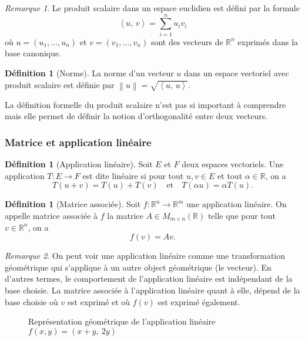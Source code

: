 \documentclass[11pt,a4paper]{article}
\numberwithin{equation}{section}
\theoremstyle{plain}
\theoremstyle{definition}
\newtheorem{definition}[theorem]{Définition}
\theoremstyle{remark}
\newtheorem*{remark}{Remarque}
\newcommand{\R}{\mathbb{R}}
\newcommand{\norm}[1]{\left\lVert #1\right\rVert}
\newcommand{\ip}[2]{\left\langle #1,\, #2\right\rangle}
\begin{document}
\begin{remark} \label{rem:ip}
    Le produit scalaire dans un espace euclidien est défini par la formule
    \[
        \ip{u}{v} = \sum_{i=1}^n u_i v_i
    \]
    où \(u = (u_1, \ldots, u_n)\) et \(v = (v_1, \ldots, v_n)\) sont des vecteurs de \(\R^n\) exprimés dans la base canonique.
\end{remark}

\begin{definition}[Norme]
    La norme d'un vecteur \(u\) dans un espace vectoriel avec produit scalaire est définie par \(\norm{u} = \sqrt{\ip{u}{u}}\).
\end{definition}

La définition formelle du produit scalaire n'est pas si important à comprendre mais elle permet de définir la notion d'orthogonalité entre deux vecteurs.

\subsubsection{Matrice et application linéaire}

\begin{definition}[Application linéaire]
Soit $E$ et $F$ deux espaces vectoriels. Une application $T : E \to F$ est dite linéaire si pour tout $u,v \in E$ et tout \(\alpha \in \R\), on a
\[
    T(u+v) = T(u) + T(v) \quad \text{et} \quad T(\alpha u) = \alpha T(u).
\]
\end{definition}

\begin{definition}[Matrice associée]
Soit $f : \R^n \to \R^m$ une application linéaire. On appelle matrice associée à $f$ la matrice $A \in M_{m \times n}(\R)$ telle que pour tout $v \in \R^n$, on a
\[
    f(v) = Av.
\]
\end{definition}

\begin{remark}
    On peut voir une application linéaire comme une transformation géométrique qui s'applique à un autre object géométrique (le vecteur).
    En d'autres termes, le comportement de l'application linéaire est indépendant de la base choisie.
    La matrice associée à l'application linéaire quant à elle, dépend de la base choisie où $v$ est exprimé et où $f(v)$ est exprimé également.
\end{remark}

\begin{figure}
    \centering
    \caption{Représentation géométrique de l'application linéaire $f(x,y) = (x + y, \ 2y)$}
\end{figure}
\end{document}
